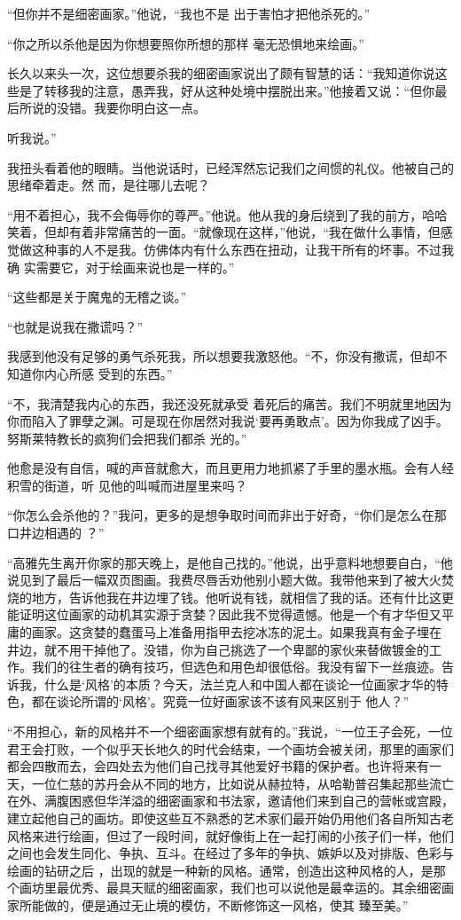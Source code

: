 \documentclass{article}
\begin{document}
“但你并不是细密画家。”他说，“我也不是
出于害怕才把他杀死的。” 

“你之所以杀他是因为你想要照你所想的那样
毫无恐惧地来绘画。” 

长久以来头一次，这位想要杀我的细密画家说出了颇有智慧的话：“我知道你说这些是了转移我的注意，愚弄我，好从这种处境中摆脱出来。”他接着又说：“但你最后所说的没错。我要你明白这一点。

\newpage
听我说。” 

我扭头看着他的眼睛。当他说话时，已经浑然忘记我们之间惯的礼仪。他被自己的思绪牵着走。然
而，是往哪儿去呢？ 

“用不着担心，我不会侮辱你的尊严。”他说。他从我的身后绕到了我的前方，哈哈笑着，但却有着非常痛苦的一面。“就像现在这样，”他说，“我在做什么事情，但感觉做这种事的人不是我。仿佛体内有什么东西在扭动，让我干所有的坏事。不过我确
实需要它，对于绘画来说也是一样的。” 


“这些都是关于魔鬼的无稽之谈。” 


“也就是说我在撒谎吗？” 

我感到他没有足够的勇气杀死我，所以想要我激怒他。“不，你没有撒谎，但却不知道你内心所感
受到的东西。” 

“不，我清楚我内心的东西，我还没死就承受
\newpage
着死后的痛苦。我们不明就里地因为你而陷入了罪孽之渊。可是现在你居然对我说‘要再勇敢点’。因为你我成了凶手。努斯莱特教长的疯狗们会把我们都杀
光的。” 

他愈是没有自信，喊的声音就愈大，而且更用力地抓紧了手里的墨水瓶。会有人经积雪的街道，听
见他的叫喊而进屋里来吗？ 

“你怎么会杀他的？”我问，更多的是想争取时间而非出于好奇，“你们是怎么在那口井边相遇的
？” 

“高雅先生离开你家的那天晚上，是他自己找的。”他说，出乎意料地想要自白，“他说见到了最后一幅双页图画。我费尽唇舌劝他别小题大做。我带他来到了被大火焚烧的地方，告诉他我在井边埋了钱。他听说有钱，就相信了我的话。还有什比这更能证明这位画家的动机其实源于贪婪？因此我不觉得遗憾。他是一个有才华但又平庸的画家。这贪婪的蠢蛋马上准备用指甲去挖冰冻的泥土。如果我真有金子埋在
\newpage
井边，就不用干掉他了。没错，你为自己挑选了一个卑鄙的家伙来替做镀金的工作。我们的往生者的确有技巧，但选色和用色却很低俗。我没有留下一丝痕迹。告诉我，什么是‘风格’的本质？今天，法兰克人和中国人都在谈论一位画家才华的特色，都在谈论所谓的‘风格’。究竟一位好画家该不该有风来区别于
他人？” 

“不用担心，新的风格并不一个细密画家想有就有的。”我说，“一位王子会死，一位君王会打败，一个似乎天长地久的时代会结束，一个画坊会被关闭，那里的画家们都会四散而去，会四处去为他们自己找寻其他爱好书籍的保护者。也许将来有一天，一位仁慈的苏丹会从不同的地方，比如说从赫拉特，从哈勒普召集起那些流亡在外、满腹困惑但华洋溢的细密画家和书法家，邀请他们来到自己的营帐或宫殿，建立起他自己的画坊。即使这些互不熟悉的艺术家们最开始仍用他们各自所知古老风格来进行绘画，但过了一段时间，就好像街上在一起打闹的小孩子们一样，他们之间也会发生同化、争执、互斗。在经过了多年的争执、嫉妒以及对排版、色彩与绘画的钻研之后
\newpage
，出现的就是一种新的风格。通常，创造出这种风格的人，是那个画坊里最优秀、最具天赋的细密画家，我们也可以说他是最幸运的。其余细密画家所能做的，便是通过无止境的模仿，不断修饰这一风格，使其
臻至美。” 
\end{document}
